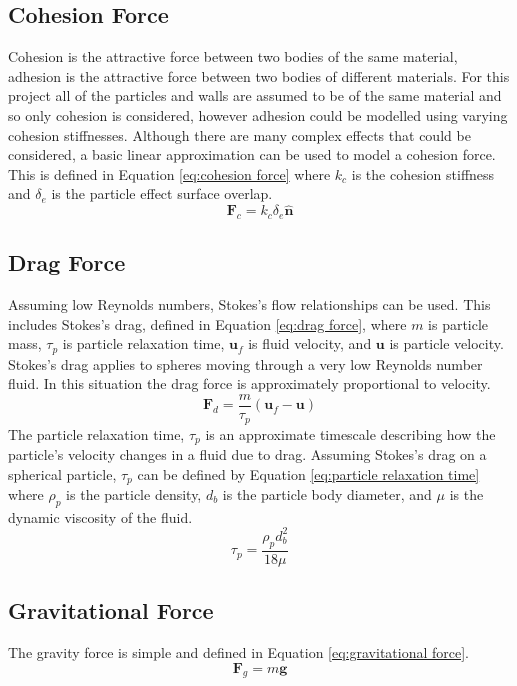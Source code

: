 \documentclass[a4paper,11pt,titlepage]{report}
\begin{document}
\subsection{Cohesion Force}
Cohesion is the attractive force between two bodies of the same material, adhesion is the attractive force between two bodies of different materials. For this project all of the particles and walls are assumed to be of the same material and so only cohesion is considered, however adhesion could be modelled using varying cohesion stiffnesses. Although there are many complex effects that could be considered\cite{tuley}, a basic linear approximation can be used to model a cohesion force. This is defined in Equation \ref{eq:cohesion force} where $k_c$ is the cohesion stiffness and $\delta_e$ is the particle effect surface overlap.
\begin{equation}
\mathbf{F}_{c} = k_{c} \delta_{e} \mathbf{\hat{n}}
\label{eq:cohesion force}
\end{equation}
\subsection{Drag Force}
\label{sec:drag force}
Assuming low Reynolds numbers, Stokes's flow relationships can be used. This includes Stokes's drag, defined in Equation \ref{eq:drag force}, where $m$ is particle mass, $\tau_p$ is particle relaxation time, $\mathbf{u}_f$ is fluid velocity, and $\mathbf{u}$ is particle velocity. Stokes's drag applies to spheres moving through a very low Reynolds number fluid. In this situation the drag force is approximately proportional to velocity.
\begin{equation}
\label{eq:drag force}
\mathbf{F}_{d} = \dfrac{m}{\tau_p} (\mathbf{u}_f - \mathbf{u})
\end{equation}
The particle relaxation time, $\tau_p$ is an approximate timescale describing how the particle's velocity changes in a fluid due to drag. Assuming Stokes's drag on a spherical particle, $\tau_p$ can be defined by Equation \ref{eq:particle relaxation time} where $\rho_p$ is the particle density, $d_b$ is the particle body diameter, and $\mu$ is the dynamic viscosity of the fluid.
\begin{equation}
\label{eq:particle relaxation time}
\tau_{p} = \dfrac{\rho_{p} d^{2}_{b}}{18 \mu}
\end{equation}
\subsection{Gravitational Force}
\label{sec:gravitational force}
The gravity force is simple and defined in Equation \ref{eq:gravitational force}.
\begin{equation}
\label{eq:gravitational force}
\mathbf{F}_{g} = m \mathbf{g}
\end{equation}
\end{document}
